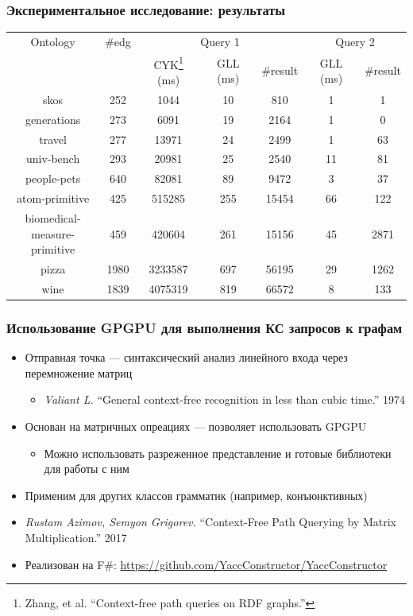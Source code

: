 \documentclass[xcolor=table,aspectratio=169]{beamer}
\begin{document}
\begin{frame}[fragile]
\transwipe[direction=90]
\frametitle{Экспериментальное исследование: результаты}
\centering
{}
\begin{tabular}{  c | c | c | c | c | c | c }
Ontology & \#edg & \multicolumn{3}{c|}{Query 1} & \multicolumn{2}{c}{Query 2} \\
\cline{3-7}
& & CYK\footnote{Zhang, et al. ``Context-free path queries on RDF graphs.''} (ms) & GLL (ms) & \#result & GLL (ms) & \#result \\
\hline 
\hline
skos        & 252  & 1044  & 10 & 810 & 1 & 1 \\
generations & 273  & 6091  & 19 & 2164 & 1 & 0 \\
travel      & 277  & 13971 & 24 & 2499 & 1 & 63 \\
univ-bench  & 293  & 20981 & 25 & 2540 & 11 & 81 \\
people-pets & 640  & 82081 & 89 & 9472 & 3 & 37 \\
atom-primitive & 425 & 515285 & 255 & 15454 & 66 & 122 \\
\shortstack{biomedical- \\ measure-primitive} & 459 & 420604 & 261 & 15156 & 45 & 2871 \\
pizza       & 1980 & 3233587 & 697 & 56195 & 29 & 1262 \\
wine        & 1839 & 4075319 & 819 & 66572 & 8 & 133 \\
\end{tabular}

\end{frame}

\begin{frame}[fragile]
  \transwipe[direction=90]
  \frametitle{Использование GPGPU для выполнения КС запросов к графам}

\begin{itemize} 
\item Отправная точка --- синтаксический анализ линейного входа через перемножение матриц
\begin{itemize}     
  \item \emph{Valiant L.} ``General context-free recognition in less than cubic time.'' 1974
\end{itemize}
\item Основан на матричных опреациях --- позволяет использовать GPGPU
\begin{itemize}     
  \item Можно использовать разреженное представление и готовые библиотеки для работы с ним
\end{itemize}
\item Применим для других классов грамматик (например, конъюнктивных)
\item \emph{Rustam Azimov, Semyon Grigorev.} ``Context-Free Path Querying by Matrix Multiplication.'' 2017
\item Реализован на F\#: \url{https://github.com/YaccConstructor/YaccConstructor}
\end{itemize}
\end{frame}
\end{document}
